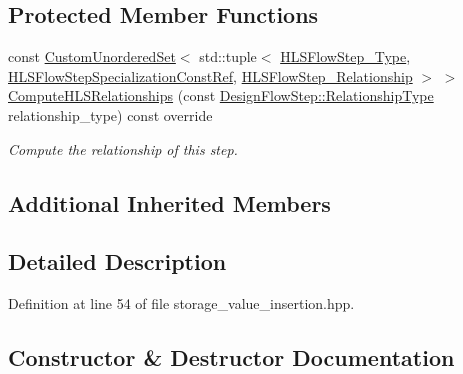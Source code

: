 \subsection*{Protected Member Functions}
\begin{DoxyCompactItemize}
\item 
const \hyperlink{classCustomUnorderedSet}{Custom\+Unordered\+Set}$<$ std\+::tuple$<$ \hyperlink{hls__step_8hpp_ada16bc22905016180e26fc7e39537f8d}{H\+L\+S\+Flow\+Step\+\_\+\+Type}, \hyperlink{hls__step_8hpp_a5fdd2edf290c196531d21d68e13f0e74}{H\+L\+S\+Flow\+Step\+Specialization\+Const\+Ref}, \hyperlink{hls__step_8hpp_a3ad360b9b11e6bf0683d5562a0ceb169}{H\+L\+S\+Flow\+Step\+\_\+\+Relationship} $>$ $>$ \hyperlink{classstorage__value__insertion_ac5383fdac16e735bf98653499943f06f}{Compute\+H\+L\+S\+Relationships} (const \hyperlink{classDesignFlowStep_a723a3baf19ff2ceb77bc13e099d0b1b7}{Design\+Flow\+Step\+::\+Relationship\+Type} relationship\+\_\+type) const override
\begin{DoxyCompactList}\small\item\em Compute the relationship of this step. \end{DoxyCompactList}\end{DoxyCompactItemize}
\subsection*{Additional Inherited Members}


\subsection{Detailed Description}


Definition at line 54 of file storage\+\_\+value\+\_\+insertion.\+hpp.



\subsection{Constructor \& Destructor Documentation}
\mbox{\label{classstorage__value__insertion_a1410b828a19550cfa7821e33369dfcc8}} 
